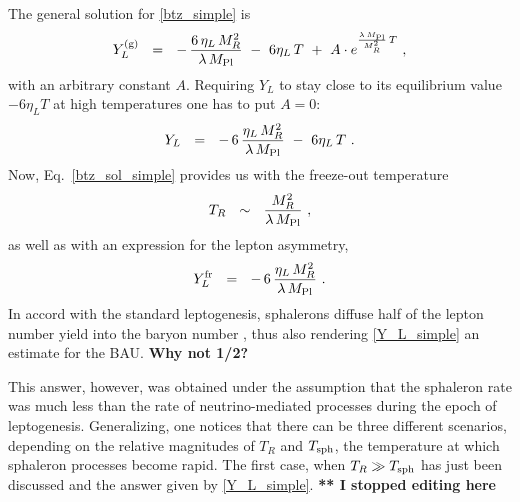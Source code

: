 \documentclass[12pt]{revtex4}
\newcommand{\Mpl}{M_{\rm Pl}}
\newcommand{\Tsph}{T_{\rm sph}}
\begin{document}
	The general solution for \eqref{btz_simple} is
\[
	Y_L^{(\rm g)} ~~=~~ -\,\frac{6\,\eta_L\,M_R^2}{\lambda\,\Mpl}
		~-~ 6\eta_L\,T ~+~
		A\cdot e^{\frac{\lambda\, \Mpl}{M_R^2}\, T}~,
\]
	with an arbitrary constant $ A $.
	Requiring $ Y_L $ to stay close to its equilibrium value 
	$ - 6\eta_L T $ at high temperatures one has to 
	put $ A = 0 $:
\begin{equation}
\label{btz_sol_simple}
	Y_L ~~=~~ -\,6\,\frac{\eta_L\,M_R^2}{\lambda\,\Mpl}
		~-~ 6\eta_L\,T ~.
\end{equation}
	Now, Eq.~\eqref{btz_sol_simple} provides us with the freeze-out
	temperature
\begin{equation}
\label{T_R}
	T_R ~~\sim~~ \frac{M_R^2}{\lambda\,\Mpl}~,
\end{equation}
	as well as with an expression for the lepton asymmetry,
\begin{equation}
\label{Y_L_simple}
	Y_L^{\rm fr} ~~=~~ -\, 6\,\frac{\eta_L\,M_R^2}{\lambda\,\Mpl}~.
\end{equation}
	In accord with the standard leptogenesis, sphalerons diffuse
	half of the lepton number yield into the baryon number
\cite{Kuzmin:1985mm}, 
	thus also rendering \eqref{Y_L_simple} an estimate for the BAU.
{	\bf Why not 1/2?}
	
	This answer, however, was obtained under the assumption that
	the sphaleron rate was much less than the rate of 
	neutrino-mediated processes during the epoch of leptogenesis.
	Generalizing, one notices that  there can be three different scenarios, 
	depending on the relative magnitudes of $ T_R $ and $ \Tsph $, the 
	temperature at which sphaleron processes become rapid.
	The first case, when $ T_R \gg \Tsph $ has just been discussed
	and the answer given by \eqref{Y_L_simple}.
	{\bf *** I stopped editing here}
\end{document}
